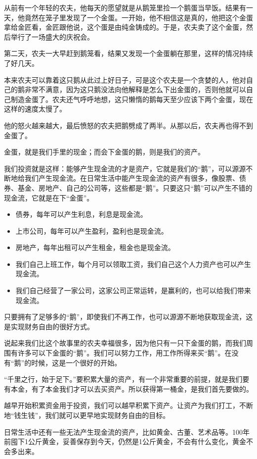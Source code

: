 {\kaishu 从前有一个年轻的农夫，他每天的愿望就是从鹅笼里捡一个鹅蛋当早饭。结果有一天，他竟然在笼子里发现了一个金蛋。一开始，他不相信这是真的，他把这个金蛋拿给金匠看，金匠跟他说，这个蛋是由纯金铸成的。于是，农夫卖了这个金蛋，然后举行了一场盛大的庆祝会。}

{\kaishu 第二天，农夫一大早赶到鹅笼看，结果又发现一个金蛋躺在那里，这样的情况持续了好几天。}

{\kaishu 本来农夫可以靠着这只鹅从此过上好日子，可是这个农夫是一个贪婪的人，他对自己的鹅非常不满意，因为这只鹅没法向他解释是怎么下出金蛋的，否则他就可以自己制造金蛋了。农夫还气呼呼地想，这只懒惰的鹅每天至少应该下两个金蛋，现在这样的速度太慢了。}

{\kaishu 他的怒火越来越大，最后愤怒的农夫把鹅劈成了两半。从那以后，农夫再也得不到金蛋了。}

金蛋，就是我们手里的现金；而会下金蛋的鹅，则是我们的资产。

我们投资就是这样：能够产生现金流的才是资产，它就是我们的“鹅”，可以源源不断地给我们产生现金流。在日常生活中能产生现金流的资产有很多，像股票、债券、基金、房地产、自己的公司等，这些都是“鹅”。只要这只“鹅”可以产生不错的现金流，它就是在下“金蛋”。

\begin{itemize}
\item 债券，每年可以产生利息，利息是现金流。
\item 上市公司，每年可以产生盈利，盈利也是现金流。
\item 房地产，每年出租可以产生租金，租金也是现金流。
\item 我们自己上班工作，每个月可以领取工资，我们自己这个人力资产也可以产生现金流。
\item 我们自己经营了一家公司，这家公司正常运转，是赢利的，也可以给我们带来现金流。
\end{itemize}

只要拥有了足够多的“鹅”，即使我们不再工作，也可以源源不断地获取现金流，这是实现财务自由的很好方式。

说起来我们比这个故事里的农夫幸福很多，因为他只有一只下金蛋的鹅，而我们周围有许多可以下金蛋的“鹅”。我们可以努力工作，用工作所得来买“鹅”。在没有“鹅”的时候，这是一个很好的开始。

“千里之行，始于足下。”要积累大量的资产，有一个非常重要的前提，就是我们要有本金，有了本金我们才可以去买资产。所以获得第一桶金，是我们首先要做的。

越早开始积累资金用于投资，我们可以越早积累下资产。让资产为我们打工，不断地“钱生钱”，我们就可以更早地实现财务自由的目标。

日常生活中还有一些无法产生现金流的资产，比如黄金、古董、艺术品等。100年前囤下1公斤黄金，妥善保存到今天，仍然是1公斤黄金，不会有什么变化，黄金不会多出来。

